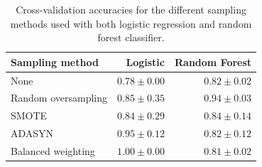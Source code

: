 \begin{table}[h]
    \centering
    \caption{Cross-validation accuracies for the different sampling methods
                used with both logistic regression and random forest
                classifier.}
    \label{tab:crossvals}
    \begin{tabular}{l|r|r}
        Sampling method & Logistic & Random Forest \\
        \hline
        None & $0.78 \pm 0.00$ & $0.82 \pm 0.02$ \\
        Random oversampling & $0.85 \pm 0.35$ & $0.94 \pm 0.03$ \\
        SMOTE & $0.84 \pm 0.29$ & $0.84 \pm 0.14$ \\
        ADASYN & $0.95 \pm 0.12$ & $0.82 \pm 0.12$ \\
        Balanced weighting & $1.00 \pm 0.00$ & $0.81 \pm 0.02$ \\
    \end{tabular}
\end{table}

